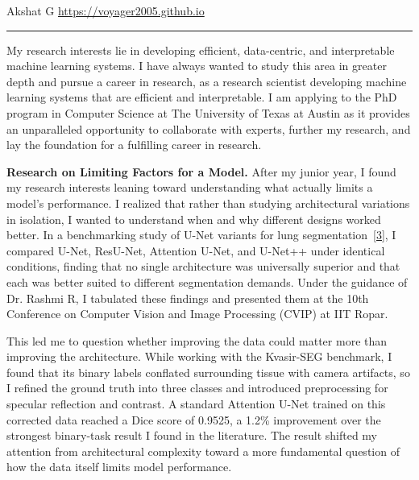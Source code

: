\documentclass[12pt]{article}
\begin{document}
{\small Akshat G \hfill \url{https://voyager2005.github.io} \par}
\vspace{4pt}
\hrule
\vspace{8pt}

My research interests lie in developing efficient, data-centric, and interpretable machine learning systems. I have always wanted to study this area in greater depth and pursue a career in research, as a research scientist developing machine learning systems that are efficient and interpretable. I am applying to the PhD program in Computer Science at The University of Texas at Austin as it provides an unparalleled opportunity to collaborate with experts, further my research, and lay the foundation for a fulfilling career in research.

\vspace{8pt}

\textbf{Research on Limiting Factors for a Model.} After my junior year, I found my research interests leaning toward understanding what actually limits a model's performance. I realized that rather than studying architectural variations in isolation, I wanted to understand when and why different designs worked better. In a benchmarking study of U-Net variants for lung segmentation~\hyperref[ref3]{[3]}, I compared U-Net, ResU-Net, Attention U-Net, and U-Net++ under identical conditions, finding that no single architecture was universally superior and that each was better suited to different segmentation demands. Under the guidance of Dr. Rashmi R, I tabulated these findings and presented them at the 10th Conference on Computer Vision and Image Processing (CVIP) at IIT Ropar.

This led me to question whether improving the data could matter more than improving the architecture. While working with the Kvasir-SEG benchmark, I found that its binary labels conflated surrounding tissue with camera artifacts, so I refined the ground truth into three classes and introduced preprocessing for specular reflection and contrast. A standard Attention U-Net trained on this corrected data reached a Dice score of 0.9525, a 1.2\% improvement over the strongest binary-task result I found in the literature. The result shifted my attention from architectural complexity toward a more fundamental question of how the data itself limits model performance.


\vspace{8pt}
\end{document}
